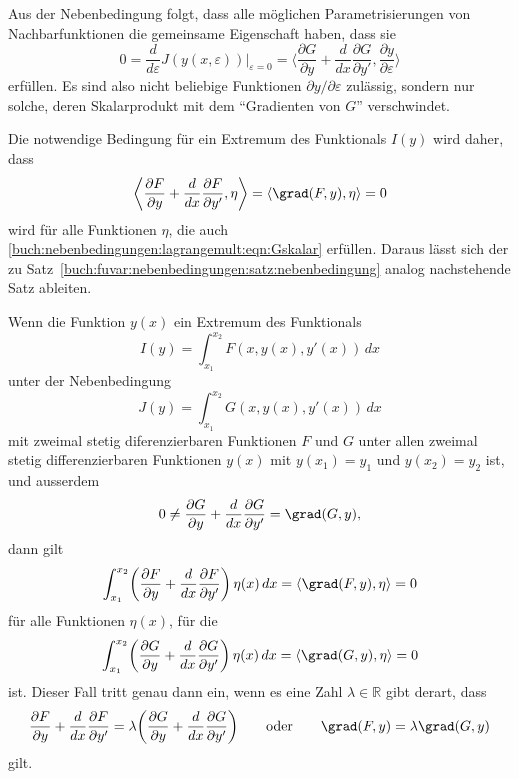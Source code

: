 Aus der Nebenbedingung folgt, dass alle möglichen Parametrisierungen
von Nachbarfunktionen die gemeinsame Eigenschaft haben, dass sie
\begin{equation}
0
=
\frac{d}{d\varepsilon}J(y(x,\varepsilon))\bigg|_{\varepsilon=0}
=
\biggl\langle
\frac{\partial G}{\partial y}+\frac{d}{dx}\frac{\partial G}{\partial y'}
,
\frac{\partial y}{\partial \varepsilon}
\biggr\rangle
\label{buch:nebenbedingungen:lagrangemult:eqn:Gskalar}
\end{equation}
erfüllen.
Es sind also nicht beliebige Funktionen $\partial y/\partial \varepsilon$
zulässig, sondern nur solche, deren Skalarprodukt mit dem
``Gradienten von $G$'' verschwindet.

Die notwendige Bedingung für ein Extremum des Funktionals $I(y)$ wird 
daher, dass
\[
\biggl\langle
\frac{\partial F}{\partial y} + \frac{d}{dx}\frac{\partial F}{\partial y'},
\eta
\biggr\rangle
=
\langle
\grad(F,y),
\eta
\rangle
=
0
\]
wird für alle Funktionen $\eta$, die auch
\eqref{buch:nebenbedingungen:lagrangemult:eqn:Gskalar}
erfüllen.
Daraus lässt sich der zu
Satz~\ref{buch:fuvar:nebenbedingungen:satz:nebenbedingung}
analog nachstehende Satz ableiten.

\begin{satz}
\label{buch:nebenbedingungen:lagrangemult:satz:einenb}
Wenn die Funktion $y(x)$ ein Extremum des Funktionals
\[
I(y) = \int_{x_1}^{x_2} F(x,y(x),y'(x))\,dx
\]
unter der Nebenbedingung
\[
J(y) = \int_{x_1}^{x_2} G(x,y(x),y'(x))\,dx
\]
mit zweimal stetig diferenzierbaren Funktionen $F$ und $G$
unter allen zweimal stetig differenzierbaren Funktionen $y(x)$
mit $y(x_1)=y_1$ und $y(x_2)=y_2$ ist,
und ausserdem
\[
0
\ne
\frac{\partial G}{\partial y}+\frac{d}{dx}\frac{\partial G}{\partial y'}
=
\grad (G,y),
\]
dann gilt
\[
\int_{x_1}^{x_2}
\biggl(
\frac{\partial F}{\partial y}
+
\frac{d}{dx}\frac{\partial F}{\partial y'}
\biggr)\,
\eta(x)\,dx
=
\langle
\grad (F,y),\eta
\rangle
=0
\]
für alle Funktionen $\eta(x)$, für die
\[
\int_{x_1}^{x_2}
\biggl(
\frac{\partial G}{\partial y}
+
\frac{d}{dx}\frac{\partial G}{\partial y'}
\biggr)\,
\eta(x)\,dx
=
\langle
\grad (G,y),\eta
\rangle
=0
\]
ist.
Dieser Fall tritt genau dann ein, wenn es eine Zahl $\lambda\in\mathbb{R}$
gibt derart, dass
\begin{equation}
\frac{\partial F}{\partial y}
+
\frac{d}{dx}\frac{\partial F}{\partial y'}
=
\lambda
\biggl(
\frac{\partial G}{\partial y}
+
\frac{d}{dx}\frac{\partial G}{\partial y'}
\biggr)
\qquad\text{oder}\qquad
\grad (F,y) = \lambda \grad(G,y)
\label{buch:nebenbedingungen:lagrangemult:notwendig}
\end{equation}
gilt.
\end{satz}

